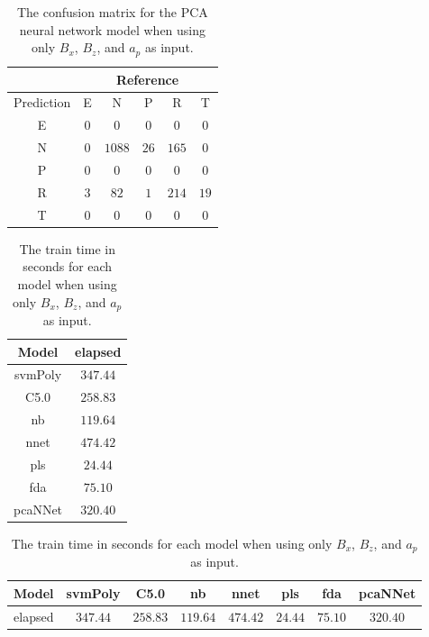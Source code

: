 \begin{table}[!ht]
	\centering
	\begin{tabular}{|c|c|c|c|c|c|}
		\hline
		 & \multicolumn{5}{|c|}{Reference} \\ \hline
		 Prediction & E & N & P & R & T \\ \hline
		 E & $0$ & $0$ & $0$ & $0$ & $0$ \\ \hline
		 N & $0$ & $1088$ & $26$ & $165$ & $0$ \\ \hline
		 P & $0$ & $0$ & $0$ & $0$ & $0$ \\ \hline
		 R & $3$ & $82$ & $1$ & $214$ & $19$ \\ \hline
		 T & $0$ & $0$ & $0$ & $0$ & $0$ \\ \hline
	\end{tabular}
	\caption{The confusion matrix for the PCA neural network model when using only $B_{x}$, $B_{z}$, and $a_{p}$ as input.}
	\label{tab:cm:xzap:pcaNNet}
\end{table}

\begin{table}[!ht]
	\centering
	\begin{tabular}{|c|c|}
		\hline
		Model & elapsed \\ \hline
		svmPoly & $347.44$ \\ \hline
		C5.0 & $258.83$ \\ \hline
		nb & $119.64$ \\ \hline
		nnet & $474.42$ \\ \hline
		pls & $24.44$ \\ \hline
		fda & $75.10$ \\ \hline
		pcaNNet & $320.40$ \\ \hline
	\end{tabular}
	\caption{The train time in seconds for each model when using only $B_{x}$, $B_{z}$, and $a_{p}$ as input.}
	\label{tab:time:xzap:train}
\end{table}

\begin{table}[!ht]
	\centering
	\begin{tabular}{|c|c|c|c|c|c|c|c|}
		\hline
		Model & svmPoly & C5.0 & nb & nnet & pls & fda & pcaNNet \\ \hline
		elapsed & $347.44$ & $258.83$ & $119.64$ & $474.42$ & $24.44$ & $75.10$ & $320.40$ \\ \hline
	\end{tabular}
	\caption{The train time in seconds for each model when using only $B_{x}$, $B_{z}$, and $a_{p}$ as input.}
	\label{tab:time:reverse:xzap:train}
\end{table}

